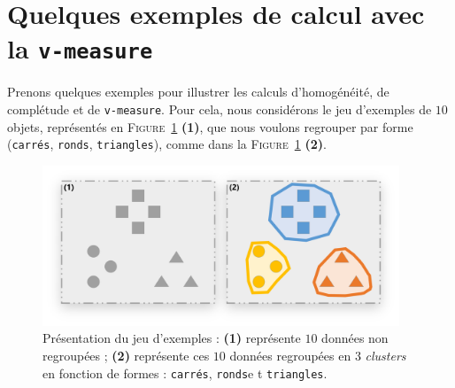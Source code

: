 	\newpage
	\section{Quelques exemples de calcul avec la \texttt{v-measure}}
	\label{annex:D.2-ANNEXE-EVALUATION-CLUSTERING-EXEMPLE-VMEASURE}
		
		Prenons quelques exemples pour illustrer les calculs d'homogénéité, de complétude et de \texttt{v-measure}.
		Pour cela, nous considérons le jeu d'exemples de $10$ objets, représentés en \textsc{Figure~\ref{figure:D.2-ANNEXE-EVALUATION-CLUSTERING-EXEMPLE-VMEASURE-0-PRESENTATION}} \textbf{(1)}, que nous voulons regrouper par forme (\texttt{carrés}, \texttt{ronds}, \texttt{triangles}), comme dans la \textsc{Figure~\ref{figure:D.2-ANNEXE-EVALUATION-CLUSTERING-EXEMPLE-VMEASURE-0-PRESENTATION}} \textbf{(2)}.
		\begin{figure}[H]
			\centering
			\includegraphics[width=0.95\textwidth]{figures/annexe-vmeasure-presentation}
			\caption{
				Présentation du jeu d'exemples :
				\textbf{(1)} représente $10$ données non regroupées ;
				\textbf{(2)} représente ces $10$ données regroupées en $3$ \textit{clusters} en fonction de formes : \texttt{carrés}, \texttt{ronds}e t \texttt{triangles}.
			}
			\label{figure:D.2-ANNEXE-EVALUATION-CLUSTERING-EXEMPLE-VMEASURE-0-PRESENTATION}
		\end{figure}
		
